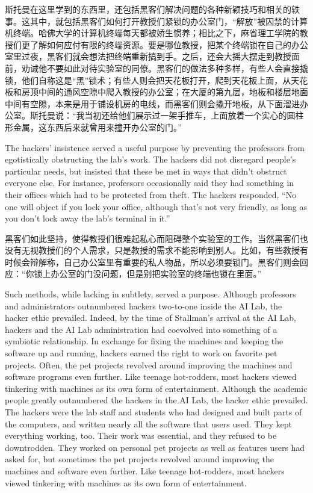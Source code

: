 \ifdefined\chs
斯托曼在这里学到的东西里，还包括黑客们解决问题的各种新颖技巧和相关的轶事。这其中，就包括黑客们如何打开教授们紧锁的办公室门，``解放''被囚禁的计算机终端。哈佛大学的计算机终端每天都被娇生惯养；相比之下，麻省理工学院的教授们更了解如何应付有限的终端资源。要是哪位教授，把某个终端锁在自己的办公室里过夜，黑客们就会想法把终端重新搞到手。之后，还会大摇大摆走到教授面前，劝诫他不要如此对待实验室的同僚。黑客们的做法多种多样，有些人会直接撬锁，他们自称这是``黑''锁术；有些人则会把天花板打开，爬到天花板上面，从天花板和房顶中间的通风空隙中爬入教授的办公室；在大厦的第九层，地板和楼层地面中间有空隙，本来是用于铺设机房的电线，而黑客们则会撬开地板，从下面溜进办公室。斯托曼说：``我当初还给他们展示过一架手推车，上面放着一个实心的圆柱形金属，这东西后来就曾用来撞开办公室的门。''
\fi

\ifdefined\vtwo
\ifdefined\eng
The hackers' insistence served a useful purpose by preventing the professors from egotistically obstructing the lab's work.  The hackers did not disregard people's particular needs, but insisted that these be met in ways that didn't obstruct everyone else.  For instance, professors occasionally said they had something in their offices which had to be protected from theft.  The hackers responded, ``No one will object if you lock your office, although that's not very friendly, as long as you don't lock away the lab's terminal in it.''
\fi

\ifdefined\chs
黑客们如此坚持，使得教授们很难起私心而阻碍整个实验室的工作。当然黑客们也没有无视教授们的个人需求，只是教授的需求不能影响到别人。比如，有些教授有时候会辩解称，自己办公室里有重要的私人物品，所以必须要锁门。黑客们则会回应：``你锁上办公室的门没问题，但是别把实验室的终端也锁在里面。''
\fi
\fi

\ifdefined\eng
\ifdefined\vone
Such methods, while lacking in subtlety, served a purpose. Although professors and administrators outnumbered hackers two-to-one inside the AI Lab, the hacker ethic prevailed. Indeed, by the time of Stallman's arrival at the AI Lab, hackers and the AI Lab administration had coevolved into something of a symbiotic relationship. In exchange for fixing the machines and keeping the software up and running, hackers earned the right to work on favorite pet projects. Often, the pet projects revolved around improving the machines and software programs even further. Like teenage hot-rodders, most hackers viewed tinkering with machines as its own form of entertainment.
\fi
\ifdefined\vtwo
Although the academic people greatly outnumbered the hackers in the AI Lab, the hacker ethic prevailed. The hackers were the lab staff and students who had designed and built parts of the computers, and written nearly all the software that users used.  They kept everything working, too.  Their work was essential, and they refused to be downtrodden.  They worked on personal pet projects as well as features users had asked for, but sometimes the pet projects revolved around improving the machines and software even further. Like teenage hot-rodders, most hackers viewed tinkering with machines as its own form of entertainment.
\fi
\fi

